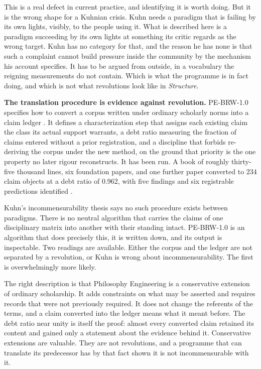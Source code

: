 \documentclass[11pt,letterpaper]{article}
\begin{document}
This is a real defect in current practice, and identifying it is worth doing.
But it is the wrong shape for a Kuhnian crisis. Kuhn needs a paradigm that is
failing by its own lights, visibly, to the people using it. What is described
here is a paradigm succeeding by its own lights at something its critic regards
as the wrong target. Kuhn has no category for that, and the reason he has none is
that such a complaint cannot build pressure inside the community by the mechanism
his account specifies. It has to be argued from outside, in a vocabulary the
reigning measurements do not contain. Which is what the programme is in fact
doing, and which is not what revolutions look like in \emph{Structure}.

\textbf{The translation procedure is evidence against revolution.} PE-BRW-1.0
specifies how to convert a corpus written under ordinary scholarly norms into a
claim ledger \citep{pebrw}. It defines a characterization step that assigns each
existing claim the class its actual support warrants, a debt ratio measuring the
fraction of claims entered without a prior registration, and a discipline that
forbids re-deriving the corpus under the new method, on the ground that priority
is the one property no later rigour reconstructs. It has been run. A book of roughly thirty-five thousand lines, six foundation papers, and one
further paper converted to 234 claim objects at a debt ratio of 0.962, with five findings and six registrable
predictions identified \citep{casebrownfield}.

Kuhn's incommensurability thesis says no such procedure exists between
paradigms. There is no neutral algorithm that carries the claims of one
disciplinary matrix into another with their standing intact. PE-BRW-1.0 is an
algorithm that does precisely this, it is written down, and its output is
inspectable. Two readings are available. Either the corpus and the ledger are not
separated by a revolution, or Kuhn is wrong about incommensurability. The first
is overwhelmingly more likely.

The right description is that Philosophy Engineering is a conservative extension
of ordinary scholarship. It adds constraints on what may be asserted and
requires records that were not previously required. It does not change the
referents of the terms, and a claim converted into the ledger means what it meant
before. The debt ratio near unity is itself the proof: almost every converted
claim retained its content and gained only a statement about the evidence behind
it. Conservative extensions are valuable. They are not revolutions, and a
programme that can translate its predecessor has by that fact shown it is not
incommensurable with it.
\end{document}

